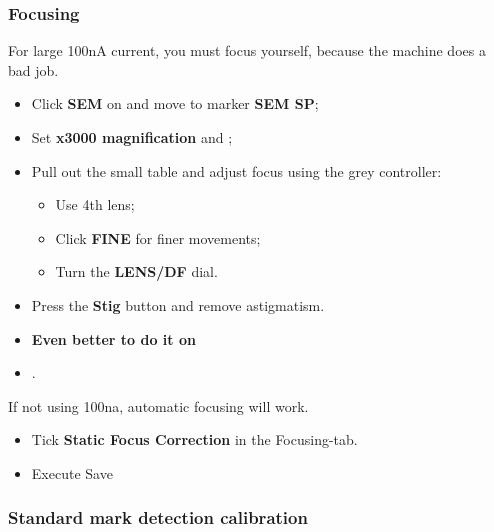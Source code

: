 \subsubsection{Focusing}
\label{sec:focusing}

\begin{framed}\noindent
  For large 100nA  current, you must focus yourself, because  the machine does a
  bad job.
\end{framed}
\begin{itemize}
\item Click \textbf{SEM} on and move to marker \textbf{SEM SP};
\item Set \textbf{x3000 magnification} and ;
\item Pull out the small table and adjust focus using the grey controller:
  \begin{itemize}
  \item Use 4th lens;
  \item Click \textbf{FINE} for finer movements;
  \item Turn the \textbf{LENS/DF} dial.
  \end{itemize}
\item Press the \textbf{Stig} button and remove astigmatism.
\item \textbf{Even better to do it on }
\item {}.
\end{itemize}

\begin{framed}\noindent
  If not using 100na, automatic focusing will work.
\end{framed}
\begin{itemize}
\item Tick \textbf{Static Focus Correction} in the Focusing-tab.
\item Execute \ira Save
\end{itemize}

\subsubsection{Standard mark detection calibration}
\label{sec:stand-mark-detect}

